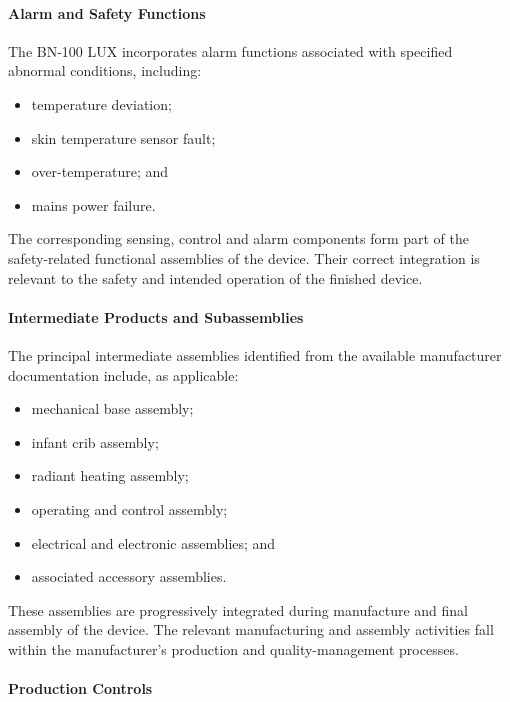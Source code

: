\paragraph{Alarm and Safety Functions}

The BN-100 LUX incorporates alarm functions associated with
specified abnormal conditions, including:

\begin{itemize}
    \item temperature deviation;
    \item skin temperature sensor fault;
    \item over-temperature; and
    \item mains power failure.
\end{itemize}

The corresponding sensing, control and alarm components form
part of the safety-related functional assemblies of the device.
Their correct integration is relevant to the safety and intended
operation of the finished device.

\paragraph{Intermediate Products and Subassemblies}

The principal intermediate assemblies identified from the available
manufacturer documentation include, as applicable:

\begin{itemize}
    \item mechanical base assembly;
    \item infant crib assembly;
    \item radiant heating assembly;
    \item operating and control assembly;
    \item electrical and electronic assemblies; and
    \item associated accessory assemblies.
\end{itemize}

These assemblies are progressively integrated during manufacture
and final assembly of the device. The relevant manufacturing and
assembly activities fall within the manufacturer's production
and quality-management processes.

\paragraph{Production Controls}

